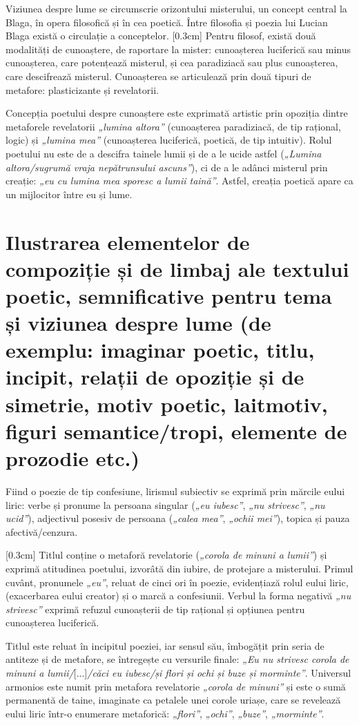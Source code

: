 Viziunea despre lume se circumscrie orizontului misterului, un concept central la Blaga, în opera filosofică și în cea poetică. Între filosofia și poezia lui Lucian Blaga există o circulație a conceptelor.
[0.3cm]
Pentru filosof, există două modalități de cunoaștere, de raportare la mister: cunoașterea luciferică sau minus cunoașterea, care potențează misterul, și cea paradiziacă sau plus cunoașterea, care descifrează misterul. Cunoașterea se articulează prin două tipuri de metafore: plasticizante și revelatorii.

Concepția poetului despre cunoaștere este exprimată artistic prin opoziția dintre metaforele revelatorii \textit{„lumina altora”} (cunoașterea paradiziacă, de tip rațional, logic) și \textit{„lumina mea”} (cunoașterea luciferică, poetică, de tip intuitiv). Rolul poetului nu este de a descifra tainele lumii și de a le ucide astfel (\textit{„Lumina altora/sugrumă vraja nepătrunsului ascuns”}), ci de a le adânci misterul prin creație: \textit{„eu cu lumina mea sporesc a lumii taină”}. Astfel, creația poetică apare ca un mijlocitor între eu și lume.


\section{Ilustrarea elementelor de compoziție și de limbaj ale textului poetic, semnificative pentru tema și viziunea despre lume {\footnotesize\normalfont(de exemplu: imaginar poetic, titlu, incipit, relații de opoziție și de simetrie, motiv poetic, laitmotiv, figuri semantice/tropi, elemente de prozodie etc.)}}

Fiind o poezie de tip confesiune, lirismul subiectiv se exprimă prin mărcile eului liric: verbe și pronume la persoana  singular (\textit{„eu iubesc”}, \textit{„nu strivesc”}, \textit{„nu ucid”}), adjectivul posesiv de persoana  (\textit{„calea mea”}, \textit{„ochii mei”}), topica și pauza afectivă/cenzura.

[0.3cm]
Titlul conține o metaforă revelatorie (\textit{„corola de minuni a lumii”}) și exprimă atitudinea poetului, izvorâtă din iubire, de protejare a misterului. Primul cuvânt, pronumele \textit{„eu”}, reluat de cinci ori în poezie, evidențiază rolul eului liric, (exacerbarea eului creator) și o marcă a confesiunii. Verbul la forma negativă \textit{„nu strivesc”} exprimă refuzul cunoașterii de tip rațional și opțiunea pentru cunoașterea luciferică.

Titlul este reluat în incipitul poeziei, iar sensul său, îmbogățit prin seria de antiteze și de metafore, se întregește cu versurile finale: \textit{„Eu nu strivesc corola de minuni a lumii/}[...]\textit{/căci eu iubesc/și flori și ochi și buze și morminte”}. Universul armonios este numit prin metafora revelatorie \textit{„corola de minuni”} și este o sumă permanentă de taine, imaginate ca petalele unei corole uriașe, care se revelează eului liric într-o enumerare metaforică: \textit{„flori”}, \textit{„ochi”}, \textit{„buze”}, \textit{„morminte”}.

